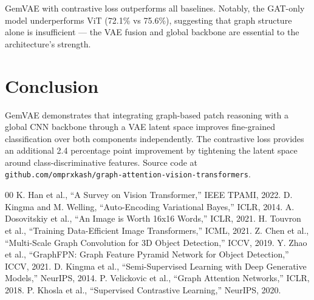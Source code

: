 \documentclass[conference]{IEEEtran}
\begin{document}
GemVAE with contrastive loss outperforms all baselines. Notably, the GAT-only model underperforms ViT (72.1\% vs 75.6\%), suggesting that graph structure alone is insufficient — the VAE fusion and global backbone are essential to the architecture's strength.

\section{Conclusion}

GemVAE demonstrates that integrating graph-based patch reasoning with a global CNN backbone through a VAE latent space improves fine-grained classification over both components independently. The contrastive loss provides an additional 2.4 percentage point improvement by tightening the latent space around class-discriminative features. Source code at \texttt{github.com/omprxkash/graph-attention-vision-transformers}.

\begin{thebibliography}{00}
 K. Han et al., ``A Survey on Vision Transformer,'' IEEE TPAMI, 2022.
 D. Kingma and M. Welling, ``Auto-Encoding Variational Bayes,'' ICLR, 2014.
 A. Dosovitskiy et al., ``An Image is Worth 16x16 Words,'' ICLR, 2021.
 H. Touvron et al., ``Training Data-Efficient Image Transformers,'' ICML, 2021.
 Z. Chen et al., ``Multi-Scale Graph Convolution for 3D Object Detection,'' ICCV, 2019.
 Y. Zhao et al., ``GraphFPN: Graph Feature Pyramid Network for Object Detection,'' ICCV, 2021.
 D. Kingma et al., ``Semi-Supervised Learning with Deep Generative Models,'' NeurIPS, 2014.
 P. Velickovic et al., ``Graph Attention Networks,'' ICLR, 2018.
 P. Khosla et al., ``Supervised Contrastive Learning,'' NeurIPS, 2020.
\end{thebibliography}
\end{document}
